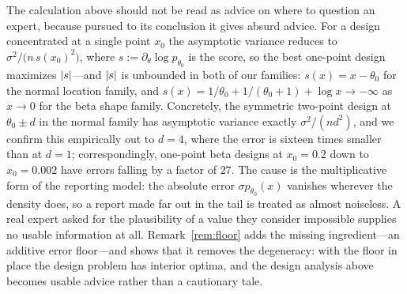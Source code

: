 \begin{remark}
\label{rem:degenerate-design}
The calculation above should not be read as advice on where to question an expert, because pursued to its conclusion it gives absurd advice. For a design concentrated at a single point $x_0$ the asymptotic variance reduces to $\sigma^{2}/\big(n\,s(x_0)^{2}\big)$, where $s:=\partial_{\theta}\log p_{\theta_0}$ is the score, so the best one-point design maximizes $\lvert s\rvert$---and $\lvert s\rvert$ is unbounded in both of our families: $s(x)=x-\theta_0$ for the normal location family, and $s(x)=1/\theta_0+1/(\theta_0+1)+\log x\to-\infty$ as $x\to0$ for the beta shape family. Concretely, the symmetric two-point design at $\theta_0\pm d$ in the normal family has asymptotic variance exactly $\sigma^{2}/(nd^{2})$, and we confirm this empirically out to $d=4$, where the error is sixteen times smaller than at $d=1$; correspondingly, one-point beta designs at $x_0=0.2$ down to $x_0=0.002$ have errors falling by a factor of $27$. The cause is the multiplicative form of the reporting model: the absolute error $\sigma p_{\theta_0}(x)$ vanishes wherever the density does, so a report made far out in the tail is treated as almost noiseless. A real expert asked for the plausibility of a value they consider impossible supplies no usable information at all. Remark~\ref{rem:floor} adds the missing ingredient---an additive error floor---and shows that it removes the degeneracy: with the floor in place the design problem has interior optima, and the design analysis above becomes usable advice rather than a cautionary tale.
\end{remark}

